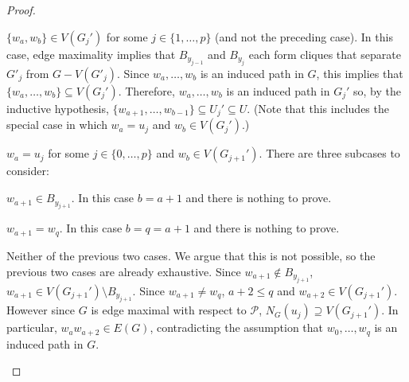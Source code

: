 \documentclass[kpfonts]{patmorin}
\theoremstyle{named}
\begin{document}
\begin{proof}
\begin{compactenum}
       \item $\{w_a,w_b\}\in V(G_j')$ for some $j\in\{1,\ldots,p\}$ (and not the preceding case). In this case, edge maximality implies that $B_{y_{j-1}}$ and $B_{y_{j}}$ each form cliques that separate $G'_{j}$ from $G-V(G'_j)$.  Since $w_a,\ldots,w_b$ is an induced path in $G$, this implies that $\{w_a,\ldots,w_b\}\subseteq V(G_j')$.  Therefore, $w_a,\ldots,w_b$ is an induced path in $G_j'$ so, by the inductive hypothesis, $\{w_{a+1},\ldots,w_{b-1}\}\subseteq U_j'\subseteq U$.  (Note that this includes the special case in which $w_a=u_j$ and $w_b\in V(G_j')$.)

       \item $w_a = u_j$ for some $j\in\{0,\ldots,p\}$ and $w_b\in V(G_{j+1}')$.  There are three subcases to consider:
       \begin{compactenum}
            \item $w_{a+1}\in B_{y_{j+1}}$.  In this case $b=a+1$ and there is nothing to prove.

            \item $w_{a+1}=w_q$. In this case $b=q=a+1$ and there is nothing to prove.

            \item Neither of the previous two cases. We argue that this is not possible, so the previous two cases are already exhaustive.  Since $w_{a+1}\not\in B_{y_{j+1}}$, $w_{a+1}\in V(G_{j+1}')\setminus B_{y_{j+1}}$. Since $w_{a+1}\neq w_q$, ${a+2}\le q$ and $w_{a+2}\in V(G_{j+1}')$.  However since $G$ is edge maximal with respect to $\mathcal{P}$, $N_G(u_j)\supseteq V(G_{j+1}')$. In particular, $w_aw_{a+2}\in E(G)$, contradicting the assumption that $w_0,\ldots,w_q$ is an induced path in $G$. \qedhere
        \end{compactenum}
    \end{compactenum}
\end{proof}
\end{document}
